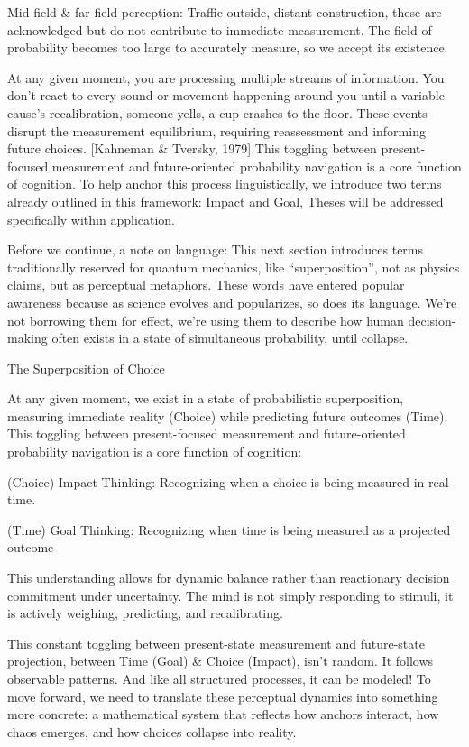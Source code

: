 \documentclass[11pt]{article}
\begin{document}
Mid-field & far-field perception: Traffic outside, distant construction, these are acknowledged but do not contribute to immediate measurement. The field of probability becomes too large to accurately measure, so we accept its existence. 

At any given moment, you are processing multiple streams of information. You don’t react to every sound or movement happening around you until a variable cause’s recalibration, someone yells, a cup crashes to the floor. These events disrupt the measurement equilibrium, requiring reassessment and informing future choices. [Kahneman & Tversky, 1979] This toggling between present-focused measurement and future-oriented probability navigation is a core function of cognition. To help anchor this process linguistically, we introduce two terms already outlined in this framework: Impact and Goal, Theses will be addressed specifically within application. 

Before we continue, a note on language:
This next section introduces terms traditionally reserved for quantum mechanics, like “superposition”, not as physics claims, but as perceptual metaphors. These words have entered popular awareness because as science evolves and popularizes, so does its language.
We’re not borrowing them for effect, we’re using them to describe how human decision-making often exists in a state of simultaneous probability, until collapse.

The Superposition of Choice

At any given moment, we exist in a state of probabilistic superposition, measuring immediate reality (Choice) while predicting future outcomes (Time). This toggling between present-focused measurement and future-oriented probability navigation is a core function of cognition:

(Choice) Impact Thinking: Recognizing when a choice is being measured in real-time.

(Time) Goal Thinking: Recognizing when time is being measured as a projected outcome

This understanding allows for dynamic balance rather than reactionary decision commitment under uncertainty. The mind is not simply responding to stimuli, it is actively weighing, predicting, and recalibrating. 

This constant toggling between present-state measurement and future-state projection, between Time (Goal) & Choice (Impact), isn’t random. It follows observable patterns. And like all structured processes, it can be modeled!
To move forward, we need to translate these perceptual dynamics into something more concrete: a mathematical system that reflects how anchors interact, how chaos emerges, and how choices collapse into reality.
\end{document}
